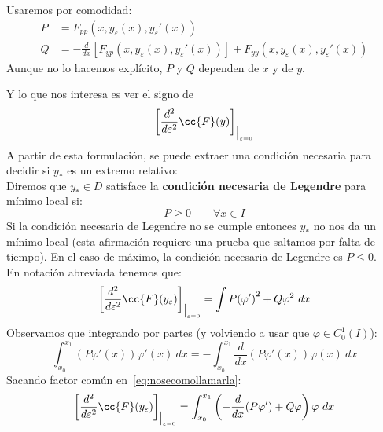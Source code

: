 \begin{notacion}
    Usaremos por comodidad:
    \begin{align*}
        P &= F_{pp}(x,y_\varepsilon(x),y_\varepsilon'(x)) \\
        Q &= -\frac{d}{dx}[F_{yp}(x,y_\varepsilon(x),y_\varepsilon'(x))] + F_{yy}(x,y_\varepsilon(x),y_\varepsilon'(x))
    \end{align*}
    Aunque no lo hacemos explícito, $P$ y $Q$ dependen de $x$ y de $y$.
\end{notacion}

\noindent
Y lo que nos interesa es ver el signo de
\begin{equation*}
    \left[\frac{d^2}{d\varepsilon^2}\cc{F}(y)\right]_{\big|_{\varepsilon = 0} 
}\end{equation*}
A partir de esta formulación, se puede extraer una condición necesaria para decidir si $y_\ast$ es un extremo relativo:\\

\noindent
Diremos que $y_\ast\in D$ satisface la \textbf{condición necesaria de Legendre} para mínimo local si:
\begin{equation*}
    P\geq 0 \qquad \forall x\in I
\end{equation*}
Si la condición necesaria de Legendre no se cumple entonces $y_\ast$ no nos da un mínimo local (esta afirmación requiere una prueba que saltamos por falta de tiempo). En el caso de máximo, la condición necesaria de Legendre es $P \leq 0$.\\

\noindent
En notación abreviada tenemos que:
\begin{equation}\label{eq:nosecomollamarla}
    \left[\frac{d^2}{d\varepsilon^2} \cc{F}(y_\varepsilon)\right]_{\big|_{\varepsilon= 0}} = \int P{(\varphi')}^{2} + Q\varphi^2~dx
\end{equation}
Observamos que integrando por partes (y volviendo a usar que $\varphi \in C^1_0(I)$):
\begin{equation*}
    \int_{x_0}^{x_1} (P\varphi'(x))\varphi'(x)~dx = -\int_{x_0}^{x_1} \frac{d}{dx}(P\varphi'(x))\varphi(x)~dx 
\end{equation*}
Sacando factor común en~\eqref{eq:nosecomollamarla}:
\begin{equation*}
    \left[\frac{d^2}{d\varepsilon^2}\cc{F}(y_\varepsilon)\right]_{\big|_{\varepsilon=0}} = \int_{x_0}^{x_1} \left(-\frac{d}{dx}(P\varphi') + Q\varphi\right)\varphi~dx 
\end{equation*}

